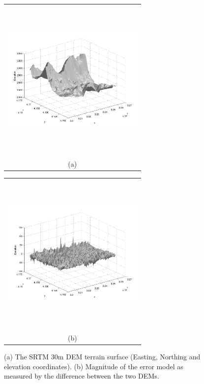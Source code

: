 \documentclass[a4paper,fleqn]{article}
\newcommand{\Pic}[2][0.85]{\begin{center}\texttt{[image: \#2]}
 \end{center} }
\begin{document}
\begin{figure}[H]
    \begin{minipage}[b]{0.6\textwidth}
        \begin{tabular}{c}
	\includegraphics[width=7cm,height=8cm,keepaspectratio]{SRTM30_dem.jpg}\\
        (a)
        \end{tabular}
    \end{minipage}
    \begin{minipage}{0.6\textwidth}
        \begin{tabular}{c}
	\includegraphics[width=7cm,height=8cm,keepaspectratio]{difference.jpg}\\
        (b)
        \end{tabular}
    \end{minipage} 
\caption{(a) The SRTM 30m DEM terrain surface (Easting, Northing and elevation coordinates). (b) Magnitude of the error model as measured by the 
difference between the two DEMs. }
\label{fig1}  
\end{figure}
\end{document}
